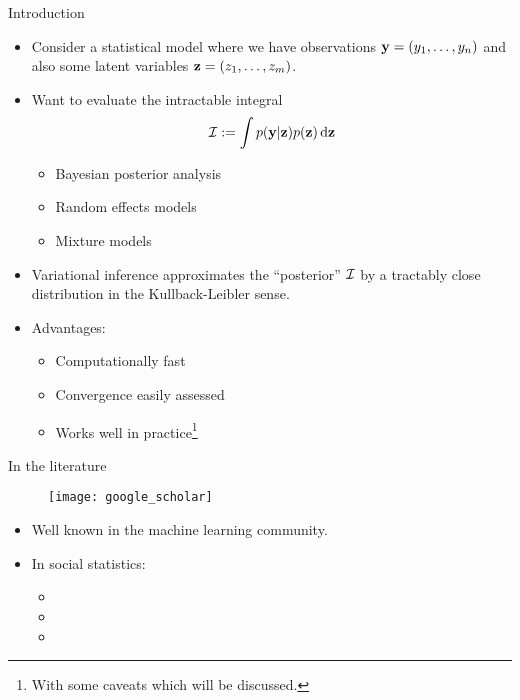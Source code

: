 \begin{frame}{Introduction}
  \begin{itemize}
    \item Consider a statistical model where we have observations ${\mathbf y} = (y_1, \dots, y_n)$ and also some latent variables ${\mathbf z} = (z_1, \dots, z_m)$.
    \pause  
    \item Want to evaluate the intractable integral
    \[
      {\mathcal I} := \int p({\mathbf y}|{\mathbf z})p({\mathbf z}) \, \text{d}{\mathbf z}
    \]
    \begin{itemize}
      \item Bayesian posterior analysis
      \item Random effects models 
      \item Mixture models
    \end{itemize}
    \pause
    \item Variational inference approximates the ``posterior'' ${\mathcal I}$ by a tractably close distribution in the Kullback-Leibler sense.
    \pause
    \item Advantages:
    \begin{itemize}
      \item Computationally fast
      \item Convergence easily assessed
      \item Works well in practice\footnote{With some caveats which will be discussed.} 
    \end{itemize}
  \end{itemize}
\end{frame}

\begin{frame}{In the literature}
  \vspace{-15pt}
  \begin{figure}[h]
    \texttt{[image: google\_scholar]}
  \end{figure}
  \vspace{-15pt}
  \begin{itemize}
    \item Well known in the machine learning community.
    \pause
    \item In social statistics:
    \begin{itemize}\footnotesize
      \item {}
      \item {}
      \item {}
    \end{itemize}
  \end{itemize}
\end{frame}

